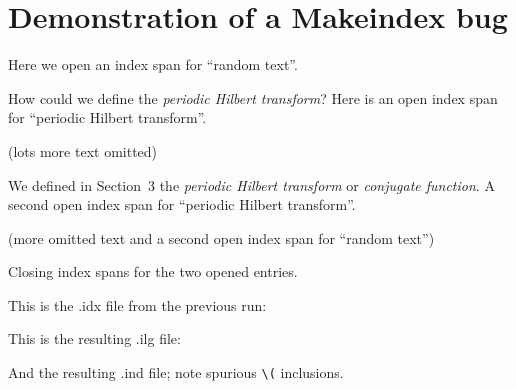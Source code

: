 \documentclass{amsbook}
\begin{document}
\chapter{Demonstration of a Makeindex bug}

%
Here we open an index span for ``random text''.

%
How could we define the \emph{periodic Hilbert transform}?
Here is an open index span for ``periodic Hilbert transform''.

(lots more text omitted)
\newpage

We defined in Section~3 the
%
\emph{periodic Hilbert transform} or \emph{conjugate function}.
A second open index span for ``periodic Hilbert transform''.

%
(more omitted text and a second open index span for ``random text'')

Closing index spans for the two opened entries.
%
%

\vspace{1\baselineskip}

\newpage
\noindent This is the .idx file from the previous run:

\vspace{2\baselineskip}
This is the resulting .ilg file:

\vspace{2\baselineskip}
And the resulting .ind file; note spurious \verb+\(+ inclusions.

\end{document}
